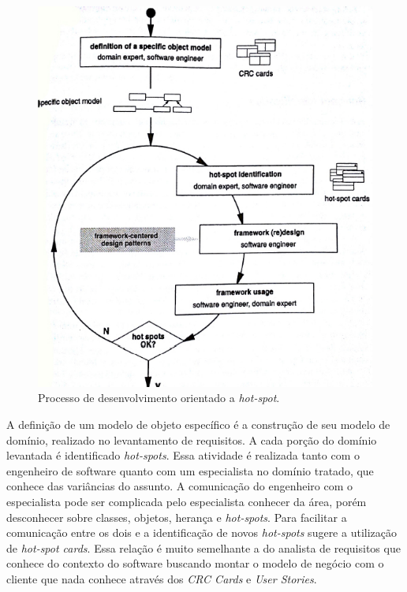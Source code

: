 \begin{figure}[h]
	\centering
	\label{fig15}
		\includegraphics[keepaspectratio=true,scale=0.4]{figuras/hotspotdd.jpg}
	\caption{Processo de desenvolvimento orientado a \textit{hot-spot}. \cite{Fayad1999}}
\end{figure}

A definição de um modelo de objeto específico é a construção de seu modelo de domínio, realizado no levantamento de requisitos. A cada porção do domínio levantada é identificado \textit{hot-spots}. Essa atividade é realizada tanto com o engenheiro de software quanto com um especialista no domínio tratado, que conhece das variâncias do assunto. A comunicação do engenheiro com o especialista pode ser complicada pelo especialista conhecer da área, porém desconhecer sobre classes, objetos, herança e \textit{hot-spots}. Para facilitar a comunicação entre os dois e a identificação de novos \textit{hot-spots} \cite{Fayad1999} sugere a utilização de \textit{hot-spot cards}. Essa relação é muito semelhante a do analista de requisitos que conhece do contexto do software buscando montar o modelo de negócio com o cliente que nada conhece através dos \textit{CRC Cards} e \textit{User Stories}.

